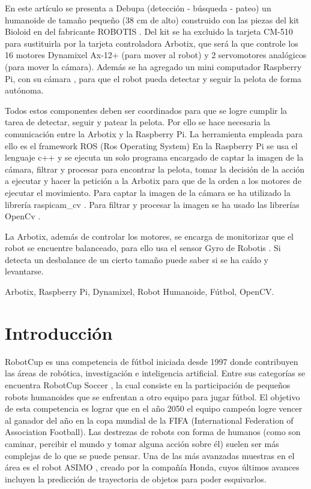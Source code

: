 \documentclass[conference, letterpaper]{IEEEtranMC1}
\begin{document}
\begin{abstractSP}
En este artículo se presenta a Debupa (detección - búsqueda - pateo) un humanoide de tamaño pequeño (38 cm de alto) construido con las piezas del kit Bioloid \cite{robotics} en  del fabricante ROBOTIS \cite{robotics1}. Del kit se ha excluido la tarjeta CM-510 para sustituirla por la tarjeta controladora Arbotix, que será la que controle los 16 motores Dynamixel Ax-12+ (para mover al robot) y 2 servomotores analógicos (para mover la cámara). Además se ha agregado un mini computador Raspberry Pi, con su cámara \cite{raspberrycam} , para que el robot pueda detectar y seguir la pelota de forma autónoma. 

Todos estos componentes deben ser coordinados para que se logre cumplir la tarea de detectar, seguir y patear la pelota. Por ello se hace necesaria la comunicación entre la Arbotix y la Raspberry Pi. La herramienta empleada para ello es el framework ROS (Ros Operating System) \cite{ros}
En la Raspberry Pi se usa el lenguaje c++ y se ejecuta un solo programa encargado de captar la imagen de la cámara, filtrar y procesar para encontrar la pelota, tomar la decisión de la acción a ejecutar y hacer la petición a la Arbotix para que de la orden a los motores de ejecutar el movimiento. Para captar la imagen de la cámara se ha utilizado la librería raspicam\_cv \cite{camara}. Para filtrar y procesar la imagen se ha usado las librerías OpenCv \cite{opencv}. 

La Arbotix, además de controlar los motores, se encarga de monitorizar que el robot se encuentre balanceado, para ello usa el sensor Gyro de Robotis \cite{gyro}. Si detecta un desbalance de un cierto tamaño puede saber si se ha caído y levantarse. 

\end{abstractSP}

\begin{IEEEkeywordsSP}
Arbotix, Raspberry Pi, Dynamixel, Robot Humanoide, Fútbol, OpenCV.
\end{IEEEkeywordsSP}


\IEEEpeerreviewmaketitle

\section{Introducci\'on}
RobotCup \cite{robotcup} es una competencia de fútbol iniciada desde 1997 donde contribuyen las áreas de robótica, investigación e inteligencia artificial. Entre sus categorías se encuentra RobotCup Soccer \cite{robotcupsoccer}, la cual consiste en la participación de pequeños robots humanoides que se enfrentan a otro equipo para jugar fútbol. El objetivo de esta competencia es lograr que en el año 2050 el equipo campeón logre vencer al ganador del año en la copa mundial de la FIFA (International Federation of Association Football). Las destrezas de robots con forma de humanos (como son caminar, percibir el mundo y tomar alguna acción sobre él) suelen ser más complejas de lo que se puede pensar. Una de las más avanzadas muestras en el área es el robot ASIMO \cite{asimo}, creado por la compañía Honda, cuyos últimos avances incluyen la predicción de trayectoria de objetos para poder esquivarlos.
\end{document}
